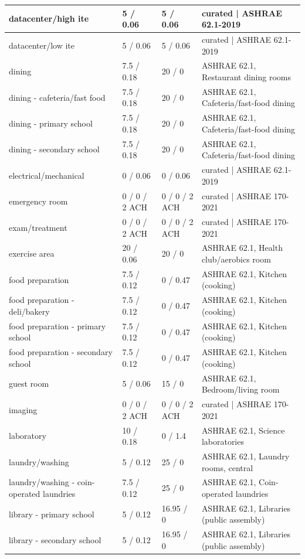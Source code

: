 \begin{center}
\begin{longtable}{|p{2.1in}|p{1.05in}|p{1.05in}|p{2.1in}|}
datacenter/high ite & 5 / 0.06 & 5 / 0.06 & curated | ASHRAE 62.1-2019 \\ \hline
datacenter/low ite & 5 / 0.06 & 5 / 0.06 & curated | ASHRAE 62.1-2019 \\ \hline
dining & 7.5 / 0.18 & 20 / 0 & ASHRAE 62.1, Restaurant dining rooms \\ \hline
dining - cafeteria/fast food & 7.5 / 0.18 & 20 / 0 & ASHRAE 62.1, Cafeteria/fast-food dining \\ \hline
dining - primary school & 7.5 / 0.18 & 20 / 0 & ASHRAE 62.1, Cafeteria/fast-food dining \\ \hline
dining - secondary school & 7.5 / 0.18 & 20 / 0 & ASHRAE 62.1, Cafeteria/fast-food dining \\ \hline
electrical/mechanical & 0 / 0.06 & 0 / 0.06 & curated | ASHRAE 62.1-2019 \\ \hline
emergency room & 0 / 0 / 2 ACH & 0 / 0 / 2 ACH & curated | ASHRAE 170-2021 \\ \hline
exam/treatment & 0 / 0 / 2 ACH & 0 / 0 / 2 ACH & curated | ASHRAE 170-2021 \\ \hline
exercise area & 20 / 0.06 & 20 / 0 & ASHRAE 62.1, Health club/aerobics room \\ \hline
food preparation & 7.5 / 0.12 & 0 / 0.47 & ASHRAE 62.1, Kitchen (cooking) \\ \hline
food preparation - deli/bakery & 7.5 / 0.12 & 0 / 0.47 & ASHRAE 62.1, Kitchen (cooking) \\ \hline
food preparation - primary school & 7.5 / 0.12 & 0 / 0.47 & ASHRAE 62.1, Kitchen (cooking) \\ \hline
food preparation - secondary school & 7.5 / 0.12 & 0 / 0.47 & ASHRAE 62.1, Kitchen (cooking) \\ \hline
guest room & 5 / 0.06 & 15 / 0 & ASHRAE 62.1, Bedroom/living room \\ \hline
imaging & 0 / 0 / 2 ACH & 0 / 0 / 2 ACH & curated | ASHRAE 170-2021 \\ \hline
laboratory & 10 / 0.18 & 0 / 1.4 & ASHRAE 62.1, Science laboratories \\ \hline
laundry/washing & 5 / 0.12 & 25 / 0 & ASHRAE 62.1, Laundry rooms, central \\ \hline
laundry/washing - coin-operated laundries & 7.5 / 0.12 & 25 / 0 & ASHRAE 62.1, Coin-operated laundries \\ \hline
library - primary school & 5 / 0.12 & 16.95 / 0 & ASHRAE 62.1, Libraries (public assembly) \\ \hline
library - secondary school & 5 / 0.12 & 16.95 / 0 & ASHRAE 62.1, Libraries (public assembly) \\ \hline

\end{longtable}
\end{center}
